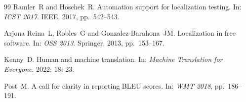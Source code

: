 \documentclass[pdflatex,sn-mathphys-num]{sn-jnl}
\begin{document}
\begin{thebibliography}{99}
Ramler~R and Hoschek~R.
\newblock Automation support for localization testing.
\newblock In: \emph{ICST 2017}. IEEE, 2017, pp.~542--543.

Arjona Reina~L, Robles~G and Gonzalez-Barahona~JM.
\newblock Localization in free software.
\newblock In: \emph{OSS 2013}. Springer, 2013, pp.~153--167.

Kenny~D.
\newblock Human and machine translation.
\newblock In: \emph{Machine Translation for Everyone}. 2022; 18: 23.

Post~M.
\newblock A call for clarity in reporting BLEU scores.
\newblock In: \emph{WMT 2018}, pp.~186--191.

\end{thebibliography}
\end{document}
